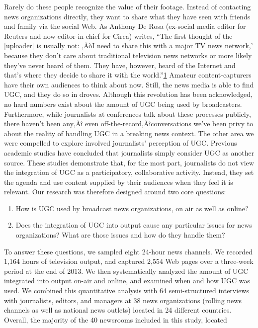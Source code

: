 \documentclass[symmetric, notoc, nobib]{towcenter-book}
\begin{document}
Rarely do these people recognize the value of their footage. Instead of contacting news organizations directly, they want to share what they have seen with friends and family via the social Web. As Anthony De Rosa (ex-social media editor for Reuters and now editor-in-chief for Circa) writes, ``The first thought of the [uploader] is usually not: ‚ÄòI need to share this with a major TV news network,' because they don't care about traditional television news networks or more likely they've never heard of them. They have, however, heard of the Internet and that's where they decide to share it with the world.''{\href{#endnotes}{1}} Amateur content-capturers have their own audiences to think
about now.
Still, the news media is able to find UGC, and they do so in droves. Although
this revolution has been acknowledged, no hard numbers exist about the
amount of UGC being used by broadcasters. Furthermore, while journalists
at conferences talk about these processes publicly, there haven't been any‚Äî
even off-the-record‚Äîconversations we've been privy to about the reality of
handling UGC in a breaking news context.
The other area we were compelled to explore involved journalists' perception
of UGC. Previous academic studies have concluded that journalists
simply consider UGC as another source. These studies demonstrate that,
for the most part, journalists do not view the integration of UGC as a participatory,
collaborative activity. Instead, they set the agenda and use content
supplied by their audiences when they feel it is relevant.
Our research was therefore designed around two core questions:
\begin{enumerate}
\item How is UGC used by broadcast news organizations, on air as
well as online?
\item Does the integration of UGC into output cause any particular
issues for news organizations? What are those issues and how do
they handle them?
\end{enumerate}
To answer these questions, we sampled eight 24-hour news channels. We
recorded 1,164 hours of television output, and captured 2,554 Web pages
over a three-week period at the end of 2013. We then systematically analyzed
the amount of UGC integrated into output on-air and online, and examined
when and how UGC was used. We combined this quantitative analysis with
64 semi-structured interviews with journalists, editors, and managers at 38
news organizations (rolling news channels as well as national news outlets)
located in 24 different countries.
Overall, the majority of the 40 newsrooms included in this study, located
\end{document}

